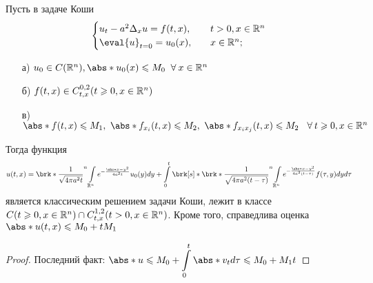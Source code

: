 	\begin{theorem}
		Пусть в задаче Коши
			\begin{equation*}
				\begin{cases}
					u_t - a^2 \Delta_x u = f(t,x), \quad & t > 0, x \in \R^n \\
					\eval{u}_{t=0} = u_0(x), \quad & x \in \R^n;
				\end{cases}
			\end{equation*}
		\begin{itemize}
			\item[а)] $u_0 \in C(\R^n), \abs*{u_0(x)} \leqslant M_0 \Forall x \in \R^n$
			\item[б)] $f(t,x) \in C^{0,2}_{t,x}(t \geqslant 0, x \in \mathbb{R}^n)$ 
            \item[в)] $\abs*{f(t,x)}\leq M_1,\ \abs*{f_{x_i}(t,x)}\leq M_2,\ \abs*{f_{x_ix_j}(t,x)}\leq M_2\ \Forall t\geq 0, x\in\R^n$ 
		\end{itemize}
		Тогда функция $$u(t,x) = \brk*{\dfrac{1}{\sqrt{4\pi a^2t}}}^n \displaystyle\int\limits_{\R^n} e^{-\frac{\abs*{x-y}^2}{4a^2t}} u_0(y)dy + \displaystyle\int\limits_0^t \brk[s]*{\brk*{\dfrac{1}{\sqrt{4\pi a^2(t-\tau)}}}^n \displaystyle\int\limits_{\R^n} e^{-\frac{\abs*{x-y}^2}{4a^2(t-\tau)}} f(\tau,y) dy} d\tau$$
		является классическим решением задачи Коши, лежит в классе $C(t \geqslant 0, x \in \mathbb{R}^n) \cap C^{1,2}_{t,x}(t > 0, x \in \mathbb{R}^n)$. Кроме того, справедлива оценка $\abs*{u(t,x)} \leqslant M_0 + tM_1$
	\end{theorem}
	\begin{proof}
		Последний факт: $\abs*{u} \leqslant M_0 + \displaystyle\int\limits_0^t \abs*{v_t} d\tau \leqslant M_0 + M_1t$
	\end{proof}